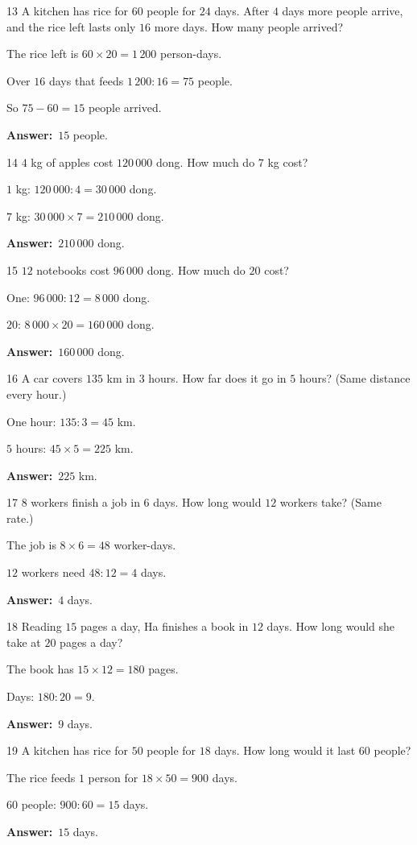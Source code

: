 \documentclass[11pt]{article}
\newif\ifsol \solfalse
\providecommand{\AnsWord}{Đáp số}
\newcommand{\dapso}[1]{\par\textbf{\AnsWord:}\ #1}
\newcommand{\probsol}[1]{%
  \begin{lrbox}{\solmeasure}\begin{minipage}{\dimexpr\linewidth-24pt\relax}#1\end{minipage}\end{lrbox}%
  \ifsol
    \begin{solbox}#1\end{solbox}%
  \else
    \setlength{\solht}{\dimexpr\ht\solmeasure+\dp\solmeasure+0.85cm\relax}%
    \ifdim\solht<1.35cm\setlength{\solht}{1.35cm}\fi
    \begin{tcolorbox}[colback=white,colframe=Line,boxrule=0.8pt,arc=5pt,
      left=8pt,right=8pt,top=4pt,bottom=4pt,height=\solht]{\footnotesize\color{Slate}\itshape\WorkWord}\end{tcolorbox}%
  \fi}
\newcommand{\gap}{\vspace{0.3cm}}
\def\WorkWord{Your work:}
\def\AnsWord{Answer}
\begin{document}
\gap
\begin{probbox}{13}{\relax}
A kitchen has rice for $60$ people for $24$ days. After $4$ days more people arrive, and the rice left lasts only $16$ more days. How many people arrived?
\end{probbox}
\probsol{
The rice left is $60\times20=1\,200$ person-days.\par Over $16$ days that feeds $1\,200:16=75$ people.\par
So $75-60=15$ people arrived.
\dapso{$15$ people.}}
\gap
\begin{probbox}{14}{\relax}
$4$ kg of apples cost $120\,000$ dong. How much do $7$ kg cost?
\end{probbox}
\probsol{
$1$ kg: $120\,000:4=30\,000$ dong.\par $7$ kg: $30\,000\times7=210\,000$ dong.
\dapso{$210\,000$ dong.}}
\gap
\begin{probbox}{15}{\relax}
$12$ notebooks cost $96\,000$ dong. How much do $20$ cost?
\end{probbox}
\probsol{
One: $96\,000:12=8\,000$ dong.\par $20$: $8\,000\times20=160\,000$ dong.
\dapso{$160\,000$ dong.}}
\gap
\begin{probbox}{16}{\relax}
A car covers $135$ km in $3$ hours. How far does it go in $5$ hours? (Same distance every hour.)
\end{probbox}
\probsol{
One hour: $135:3=45$ km.\par $5$ hours: $45\times5=225$ km.
\dapso{$225$ km.}}
\gap
\begin{probbox}{17}{\relax}
$8$ workers finish a job in $6$ days. How long would $12$ workers take? (Same rate.)
\end{probbox}
\probsol{
The job is $8\times6=48$ worker-days.\par $12$ workers need $48:12=4$ days.
\dapso{$4$ days.}}
\gap
\begin{probbox}{18}{\relax}
Reading $15$ pages a day, Ha finishes a book in $12$ days. How long would she take at $20$ pages a day?
\end{probbox}
\probsol{
The book has $15\times12=180$ pages.\par Days: $180:20=9$.
\dapso{$9$ days.}}
\gap
\begin{probbox}{19}{\relax}
A kitchen has rice for $50$ people for $18$ days. How long would it last $60$ people?
\end{probbox}
\probsol{
The rice feeds $1$ person for $18\times50=900$ days.\par $60$ people: $900:60=15$ days.
\dapso{$15$ days.}}
\end{document}
